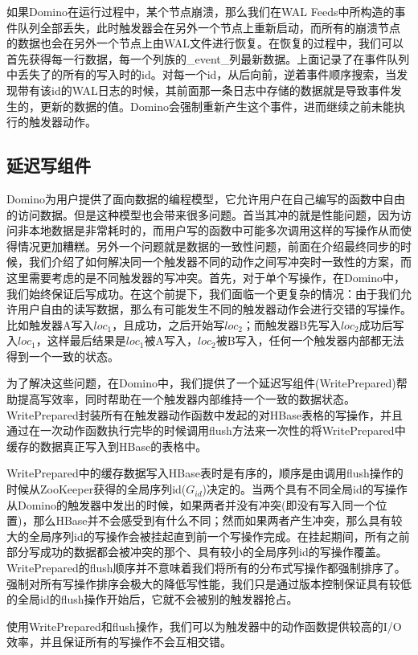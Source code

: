 如果Domino在运行过程中，某个节点崩溃，那么我们在WAL Feeds中所构造的事
件队列全部丢失，此时触发器会在另外一个节点上重新启动，而所有的崩溃节点
的数据也会在另外一个节点上由WAL文件进行恢复。在恢复的过程中，我们可以首先获得每一行数据，每一个列族的\_event\_列最新数据。上面记录了在事件队列中丢失了的所有的写入时的id。对每一个id，从后向前，逆着事件顺序搜索，当发现带有该id的WAL日志的时候，其前面那一条日志中存储的数据就是导致事件发生的，更新的数据的值。Domino会强制重新产生这个事件，进而继续之前未能执行的触发器动作。


\subsection{延迟写组件}
Domino为用户提供了面向数据的编程模型，它允许用户在自己编写的函数中自由的访问数据。但是这种模型也会带来很多问题。首当其冲的就是性能问题，因为访问非本地数据是非常耗时的，而用户写的函数中可能多次调用这样的写操作从而使得情况更加糟糕。另外一个问题就是数据的一致性问题，前面在介绍最终同步的时候，我们介绍了如何解决同一个触发器不同的动作之间写冲突时一致性的方案，而这里需要考虑的是不同触发器的写冲突。首先，对于单个写操作，在Domino中，我们始终保证后写成功。在这个前提下，我们面临一个更复杂的情况：由于我们允许用户自由的读写数据，那么有可能发生不同的触发器动作会进行交错的写操作。比如触发器A写入$loc_1$，且成功，之后开始写$loc_2$；而触发器B先写入$loc_2$成功后写入$loc_1$，这样最后结果是$loc_1$被A写入，$loc_2$被B写入，任何一个触发器内部都无法得到一个一致的状态。

为了解决这些问题，在Domino中，我们提供了一个延迟写组件(WritePrepared)帮助提高写效率，同时帮助在一个触发器内部维持一个一致的数据状态。WritePrepared封装所有在触发器动作函数中发起的对HBase表格的写操作，并且通过在一次动作函数执行完毕的时候调用flush方法来一次性的将WritePrepared中缓存的数据真正写入到HBase的表格中。

WritePrepared中的缓存数据写入HBase表时是有序的，顺序是由调用flush操作的时候从ZooKeeper获得的全局序列id($G_{id}$)决定的。当两个具有不同全局id的写操作从Domino的触发器中发出的时候，如果两者并没有冲突(即没有写入同一个位置)，那么HBase并不会感受到有什么不同；然而如果两者产生冲突，那么具有较大的全局序列id的写操作会被挂起直到前一个写操作完成。在挂起期间，所有之前部分写成功的数据都会被冲突的那个、具有较小的全局序列id的写操作覆盖。WritePrepared的flush顺序并不意味着我们将所有的分布式写操作都强制排序了。强制对所有写操作排序会极大的降低写性能，我们只是通过版本控制保证具有较低的全局id的flush操作开始后，它就不会被别的触发器抢占。

使用WritePrepared和flush操作，我们可以为触发器中的动作函数提供较高的I/O效率，并且保证所有的写操作不会互相交错。

